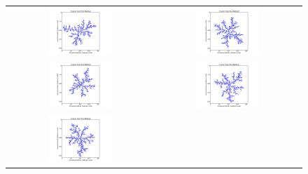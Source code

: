 \documentclass[a4paper,12pt]{article}
\begin{document}
\begin{figure}[htb]
\begin{tabular}{@{}cc@{}}
		\includegraphics[width = 0.45\textwidth]{pics/DLA_crystal_final_5.pdf} &
		\includegraphics[width = 0.45\textwidth]{pics/DLA_crystal_final_6.pdf} \\
		\includegraphics[width = 0.45\textwidth]{pics/DLA_crystal_final_7.pdf} &
		\includegraphics[width = 0.45\textwidth]{pics/DLA_crystal_final_8.pdf} \\
		\includegraphics[width = 0.45\textwidth]{pics/DLA_crystal_final_9.pdf} &

\end{tabular}
\end{figure}
\end{document}
